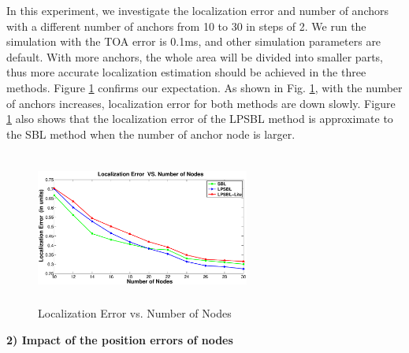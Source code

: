 In this experiment, we investigate the localization error and number of anchors with a different number of anchors from 10 to 30 in steps of 2. 
 We run the simulation with the TOA error is 0.1ms, and other simulation parameters are default. 
 With more anchors, the whole area will be divided into smaller parts, 
 thus more accurate localization estimation should be achieved in the three methods. 
Figure \ref{Nodenumbers} confirms our expectation. As shown in Fig. \ref{Nodenumbers}, with the number of anchors increases, localization error for both  methods are down slowly. 
Figure \ref{Nodenumbers} also shows that the localization error of the LPSBL method is approximate to the SBL method when the number of anchor node is larger.
  \begin{figure}[htb]
            \setlength{\abovecaptionskip}{0pt}
            \centering
			 \vspace{-2mm}
           		 \includegraphics[height=5.0cm,width=7.0cm]{image/Nodenumbers.eps}
            \caption{Localization Error vs. Number of Nodes}
             \vspace{-5mm}
             \label{Nodenumbers}
        \end{figure}	
		
\textbf{2) Impact of the position errors of nodes}

